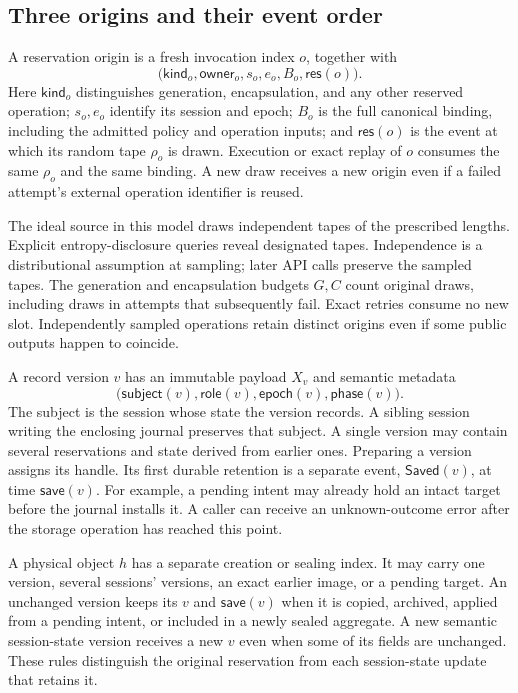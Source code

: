 \subsection{Three origins and their event order}

\begin{definition}
\label{def:reservation-origin}
A reservation origin is a fresh invocation index $o$, together with
\[
  \bigl(\mathsf{kind}_o,\mathsf{owner}_o,s_o,e_o,B_o,
        \mathsf{res}(o)\bigr).
\]
Here $\mathsf{kind}_o$ distinguishes generation, encapsulation, and any other
reserved operation; $s_o,e_o$ identify its session and epoch; $B_o$ is the full
canonical binding, including the admitted policy and operation inputs; and
$\mathsf{res}(o)$ is the event at which its random tape $\rho_o$ is drawn.
Execution or exact replay of $o$ consumes the same $\rho_o$ and the same
binding.  A new draw receives a new origin even if a failed attempt's external
operation identifier is reused.
\end{definition}

The ideal source in this model draws independent tapes of the prescribed
lengths.  Explicit entropy-disclosure queries reveal designated tapes.
Independence is a distributional assumption at sampling; later API calls
preserve the sampled tapes. The generation and encapsulation budgets
$G,C$ count original draws, including draws in attempts that subsequently
fail.  Exact retries consume no new slot.  Independently sampled operations
retain distinct origins even if some public outputs happen to coincide.

A record version $v$ has an immutable payload $X_v$ and semantic metadata
\[
  \bigl(\mathsf{subject}(v),\mathsf{role}(v),
         \mathsf{epoch}(v),\mathsf{phase}(v)\bigr).
\]
The subject is the session whose state the version records. A sibling
session writing the enclosing journal preserves that subject. A single
version may contain several reservations and state derived from earlier
ones. Preparing a version assigns its handle. Its first durable retention
is a separate event, $\mathsf{Saved}(v)$, at time $\mathsf{save}(v)$.
For example, a pending intent may already hold an intact target before
the journal installs it. A caller can receive an unknown-outcome error
after the storage operation has reached this point.

A physical object $h$ has a separate creation or sealing index.  It may carry
one version, several sessions' versions, an exact earlier image, or a pending
target.  An unchanged version keeps its $v$ and $\mathsf{save}(v)$ when it is
copied, archived, applied from a pending intent, or included in a newly sealed
aggregate.  A new semantic session-state version receives a new $v$ even when
some of its fields are unchanged.  These rules distinguish the original
reservation from each session-state update that retains it.

